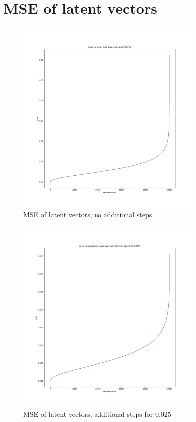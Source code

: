 \documentclass[nohyperref]{article}
\theoremstyle{plain}
\theoremstyle{definition}
\theoremstyle{remark}
\begin{document}



\newpage
\appendix
\onecolumn

\section{MSE of latent vectors}
\begin{figure}[ht]
\begin{center}
    \includegraphics[width=0.8\textwidth]{plots/MSEnoopt.png}
    \caption{MSE of latent vectors, no additional steps}
    \label{MSE1}
\end{center}
\end{figure}


\begin{figure}[ht]
\begin{center}
    \includegraphics[width=0.8\textwidth]{plots/MSE0.025.png}
    \caption{MSE of latent vectors, additional steps for $0.025$}
    \label{MSE2}
\end{center}
\end{figure}
\end{document}
